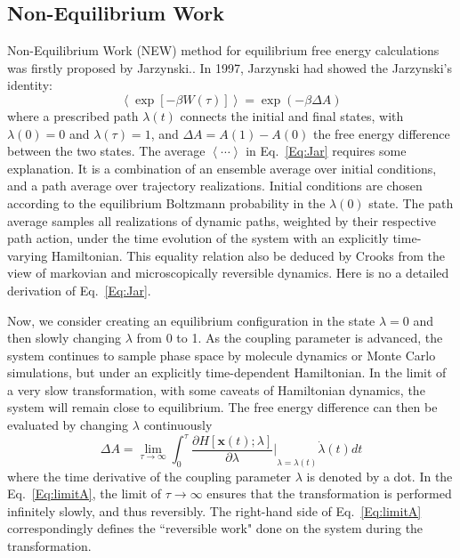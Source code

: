 \subsection{Non-Equilibrium Work\label{Sec:FEM:NEW}}
Non-Equilibrium Work (NEW) method for equilibrium free energy calculations was firstly proposed by Jarzynski.\cite{JarzynskiPRL1997}. 
In 1997, Jarzynski had showed the Jarzynski's identity:
\begin{equation}
\left \langle \exp\left[-\beta W(\tau)\right] \right \rangle = \exp(-\beta \Delta A) 
\label{Eq:Jar}
\end{equation} 
where a prescribed path $\lambda(t)$ connects the initial and final states, with $\lambda(0)=0$ and $\lambda(\tau)=1$, and $\Delta A = A(1) - A(0)$ the free energy difference between the two states. The average $\left \langle \cdots \right \rangle$ in Eq.~\ref{Eq:Jar} requires some explanation. It is a combination of an ensemble average over initial conditions, and a path average over trajectory realizations. Initial conditions are chosen according to the equilibrium Boltzmann probability in the $\lambda(0)$ state. The path average samples all realizations of dynamic paths, weighted by their respective path action, under the time evolution of the system with an explicitly time-varying Hamiltonian. This equality relation also be deduced by Crooks from the view of markovian and microscopically reversible dynamics.\cite{CrooksJSP1998} Here is no a detailed derivation of Eq.~\ref{Eq:Jar}.

Now, we consider creating an equilibrium configuration in the state $\lambda=0$ and then slowly changing $\lambda$ from 0 to 1. As the coupling parameter is advanced, the system continues to sample phase space by molecule dynamics or Monte Carlo simulations, but under an explicitly time-dependent Hamiltonian. In the limit of a very slow transformation, with some caveats of Hamiltonian dynamics, the system will remain close to equilibrium. The free energy difference can then be evaluated by changing $\lambda$ continuously
\begin{equation}
\Delta A =\lim_{\tau\to\infty} \int_{0}^{\tau} {\frac{\partial{H\left[\textbf{x}(t);\lambda\right]}}{\partial{\lambda}}\bigg\rvert}_{\lambda=\lambda(t)} \dot{\lambda}(t) dt
\label{Eq:limitA}
\end{equation}  
where the time derivative of the coupling parameter $\lambda$ is denoted by a dot. In the Eq.~\ref{Eq:limitA}, the limit of $\tau\to\infty$ ensures that the transformation is performed infinitely slowly, and thus reversibly. The right-hand side of Eq.~\ref{Eq:limitA} correspondingly defines the ``reversible work" done on the system during the transformation.

